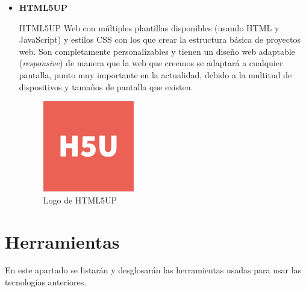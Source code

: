 \begin{itemize}
	\item \textbf{HTML5UP}
		
	HTML5UP \cite{htmlup} Web con múltiples plantillas disponibles (usando HTML y JavaScript) y estilos CSS con los que crear la estructura básica de proyectos web. Son completamente personalizables y	tienen un diseño web adaptable (\textit{responsive}) de manera que la web que creemos se adaptará a cualquier pantalla, punto muy importante en la actualidad, debido a la multitud de dispositivos y tamaños de pantalla que existen.

	\bigskip
	\begin{figure}[h]
		\centering
		\includegraphics[width=0.3\linewidth]{../images/htmluplogo}
		\caption[Logo de HTML5UP]{Logo de HTML5UP}
		\label{fig:htmluplogo}
	\end{figure}
		
\end{itemize}
	
	
	

\newpage
\section{Herramientas}

En este apartado se listarán y desglosarán las herramientas usadas para usar las tecnologías anteriores.


